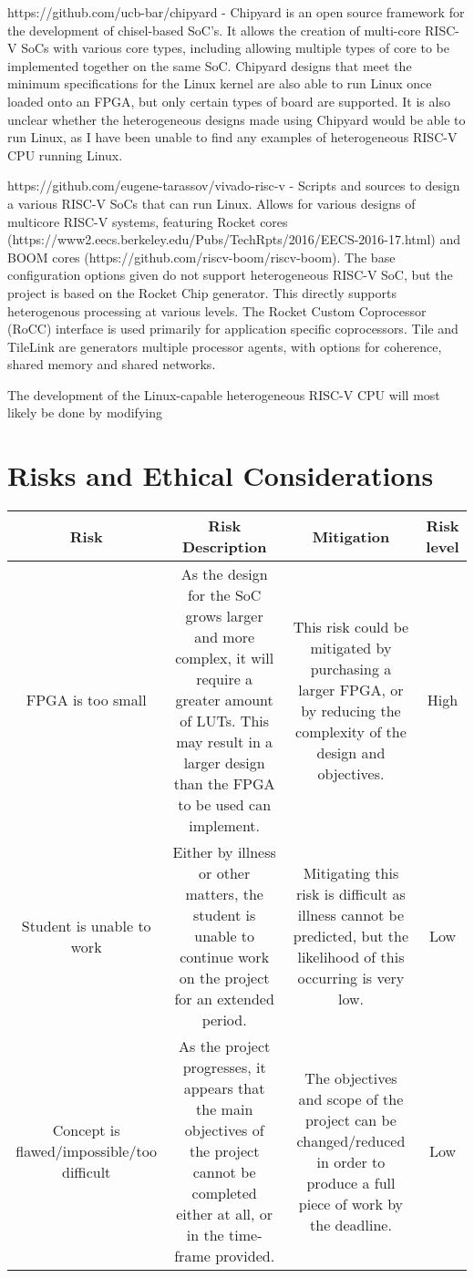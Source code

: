\documentclass[a4paper,fleqn,11pt]{article}
\begin{document}
https://github.com/ucb-bar/chipyard - Chipyard is an open source framework for the development of chisel-based SoC's. It allows the creation of multi-core RISC-V SoCs with various core types, including allowing multiple types of core to be implemented together on the same SoC. Chipyard designs that meet the minimum specifications for the Linux kernel are also able to run Linux once loaded onto an FPGA, but only certain types of board are supported. It is also unclear whether the heterogeneous designs made using Chipyard would be able to run Linux, as I have been unable to find any examples of heterogeneous RISC-V CPU running Linux.

https://github.com/eugene-tarassov/vivado-risc-v - Scripts and sources to design a various RISC-V SoCs that can run Linux. Allows for various designs of multicore RISC-V systems, featuring Rocket cores (https://www2.eecs.berkeley.edu/Pubs/TechRpts/2016/EECS-2016-17.html) and BOOM cores (https://github.com/riscv-boom/riscv-boom). The base configuration options given do not support heterogeneous RISC-V SoC, but the project is based on the Rocket Chip generator. This directly supports heterogenous processing at various levels. The Rocket Custom Coprocessor (RoCC) interface is used primarily for application specific coprocessors. Tile and TileLink are 
generators multiple processor agents, with options for coherence, shared memory and shared networks.

The development of the Linux-capable heterogeneous RISC-V CPU will most likely be done by modifying

\section{Risks and Ethical Considerations}
\begin{center}
    \begin{tabular}{|c|c|c|c|}
        \hline
        Risk & Risk Description & Mitigation & Risk level \\
        \hline
        FPGA is too small & As the design for the SoC grows larger and more complex, it will require a greater amount of LUTs. This may result in a larger design than the FPGA to be used can implement. & This risk could be mitigated by purchasing a larger FPGA, or by reducing the complexity of the design and objectives. & High \\
        \hline
        Student is unable to work & Either by illness or other matters, the student is unable to continue work on the project for an extended period. & Mitigating this risk is difficult as illness cannot be predicted, but the likelihood of this occurring is very low. & Low \\
        \hline
        Concept is flawed/impossible/too difficult & As the project progresses, it appears that the main objectives of the project cannot be completed either at all, or in the time-frame provided. & The objectives and scope of the project can be changed/reduced in order to produce a full piece of work by the deadline. & Low \\
    \end{tabular}
\end{center}
\end{document}
